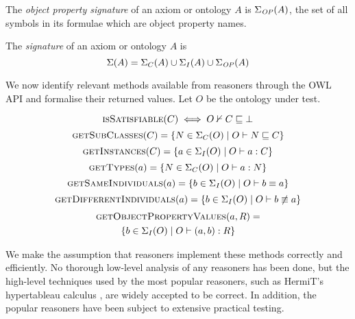 \documentclass[paper.tex]{subfiles}
\begin{document}
\begin{definition}
  The \emph{object property signature} of an axiom or ontology $A$ is $\Sigma_\mathit{OP}(A)$, the set of all symbols in its formulae which are object property names.
\end{definition}

\begin{definition}
  The \emph{signature} of an axiom or ontology $A$ is
  \[ \Sigma(A) = \Sigma_C(A) \cup \Sigma_I(A) \cup \Sigma_\mathit{OP}(A) \]
\end{definition}


We now identify relevant methods available from reasoners through the OWL API and formalise their returned values.  Let $O$ be the ontology under test.


\[ \Call{isSatisfiable}{C} \iff O \nsementails C \sqsubseteq \bot \]
\[ \Call{getSubClasses}{C} = \{ N \in \signatureC(O) \mid O \sementails N \sqsubseteq C \} \]
\[ \Call{getInstances}{C} = \{ a \in \signatureI(O) \mid O \sementails a : C \} \]
\[ \Call{getTypes}{a} = \{ N \in \signatureC(O) \mid O \sementails a : N \} \]
\[ \Call{getSameIndividuals}{a} = \{ b \in \signatureI(O) \mid O \sementails b \equiv a \} \]
\[ \Call{getDifferentIndividuals}{a} = \{ b \in \signatureI(O) \mid O \sementails b \not\equiv a \} \]
\begin{multline*}
  \Call{getObjectPropertyValues}{a, R} = \\
  \{ b \in \signatureI(O) \mid O \sementails (a, b) : R \}
\end{multline*}

We make the assumption that reasoners implement these methods correctly and efficiently.  No thorough low-level analysis of any reasoners has been done, but the high-level techniques used by the most popular reasoners, such as HermiT's hypertableau calculus \cite{Glimm:HermiT}, are widely accepted to be correct.  In addition, the popular reasoners have been subject to extensive practical testing.
\end{document}
